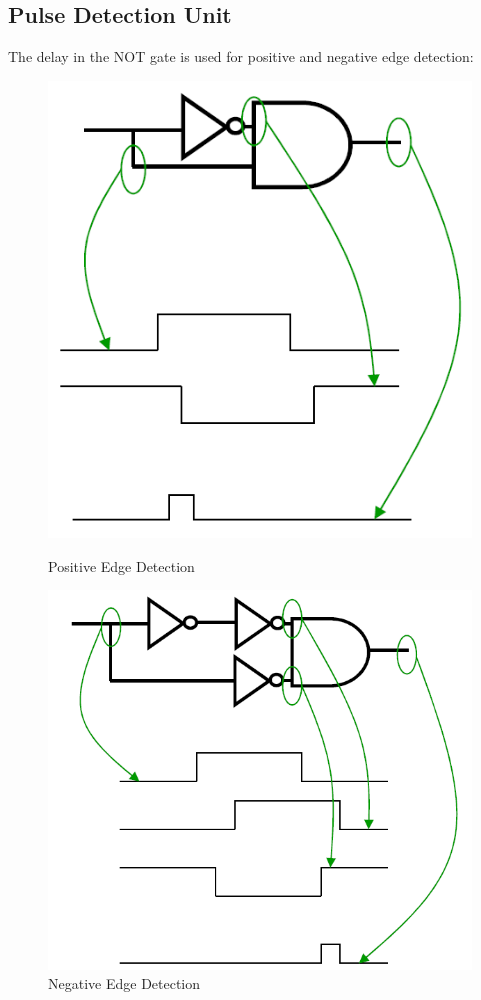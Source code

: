 \documentclass[12pt]{article}
\theoremstyle{definition}
\begin{document}
\subsection{Pulse Detection Unit}
The delay in the NOT gate is used for positive and negative edge detection:
\begin{figure}[h]
\begin{minipage}{0.45\textwidth}
\includegraphics[width = \textwidth]{8_5.png}\caption{Positive Edge Detection}\end{minipage}
\hfill
\begin{minipage}{0.45\textwidth}
\includegraphics[width = \textwidth]{8_6.png}\caption{Negative Edge Detection}\end{minipage}
\end{figure}
\end{document}

